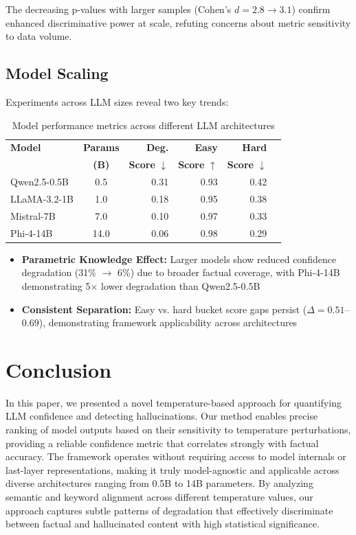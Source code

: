 \documentclass[sigconf]{acmart}
\begin{document}
The decreasing p-values with larger samples (Cohen's $d = 2.8 \rightarrow 3.1$) confirm enhanced discriminative power at scale, refuting concerns about metric sensitivity to data volume.

\subsection{Model Scaling}
Experiments across LLM sizes reveal two key trends:

\begin{table}[h]
\centering
\small
\setlength{\tabcolsep}{3pt}
\renewcommand{\arraystretch}{1.1}
\begin{tabular}{@{}lcrrrr@{}}
\hline
\textbf{Model} & \textbf{Params} & \textbf{Deg.} & \textbf{Easy} & \textbf{Hard} \\
 & \textbf{(B)} & \textbf{Score} $\downarrow$ & \textbf{Score} $\uparrow$ & \textbf{Score} $\downarrow$ \\
\hline
Qwen2.5-0.5B \cite{Qwen2.5} & 0.5 & 0.31 & 0.93 & 0.42 \\
LLaMA-3.2-1B \cite{llama_3.2} & 1.0 & 0.18 & 0.95 & 0.38 \\
Mistral-7B \cite{mistral_7b} & 7.0 & 0.10 & 0.97 & 0.33 \\
Phi-4-14B \cite{phi_4} & 14.0 & 0.06 & 0.98 & 0.29 \\
\hline
\end{tabular}
\caption{Model performance metrics across different LLM architectures}
\end{table}

\begin{itemize}
    \item \textbf{Parametric Knowledge Effect:} Larger models show reduced confidence degradation (31\% $\rightarrow$ 6\%) due to broader factual coverage, with Phi-4-14B demonstrating 5× lower degradation than Qwen2.5-0.5B
    \item \textbf{Consistent Separation:} Easy vs. hard bucket score gaps persist ($\Delta = 0.51$--$0.69$), demonstrating framework applicability across architectures
\end{itemize}


\section{Conclusion}

In this paper, we presented a novel temperature-based approach for quantifying LLM confidence and detecting hallucinations. Our method enables precise ranking of model outputs based on their sensitivity to temperature perturbations, providing a reliable confidence metric that correlates strongly with factual accuracy. The framework operates without requiring access to model internals or last-layer representations, making it truly model-agnostic and applicable across diverse architectures ranging from 0.5B to 14B parameters. By analyzing semantic and keyword alignment across different temperature values, our approach captures subtle patterns of degradation that effectively discriminate between factual and hallucinated content with high statistical significance.
\end{document}
